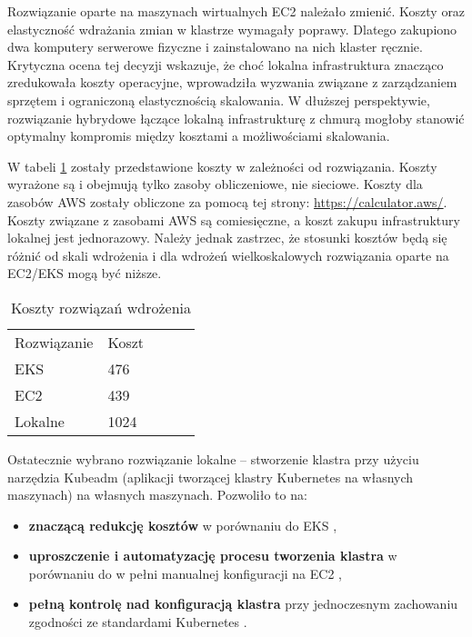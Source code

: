 \newpage

Rozwiązanie oparte na maszynach wirtualnych EC2 należało zmienić. Koszty oraz elastyczność wdrażania zmian w klastrze wymagały poprawy. Dlatego zakupiono dwa komputery serwerowe fizyczne i zainstalowano na nich klaster ręcznie. Krytyczna ocena tej decyzji wskazuje, że choć lokalna infrastruktura znacząco zredukowała koszty operacyjne, wprowadziła wyzwania związane z zarządzaniem sprzętem i ograniczoną elastycznością skalowania. W dłuższej perspektywie, rozwiązanie hybrydowe łączące lokalną infrastrukturę z chmurą mogłoby stanowić optymalny kompromis między kosztami a możliwościami skalowania.

W tabeli \ref{tab:koszty_rozwiazan_wdrazenia} zostały przedstawione koszty w zależności od rozwiązania. Koszty wyrażone są i obejmują tylko zasoby obliczeniowe, nie sieciowe. Koszty dla zasobów AWS zostały obliczone za pomocą tej strony: \url{https://calculator.aws/}. Koszty związane z zasobami AWS są comiesięczne, a koszt zakupu infrastruktury lokalnej jest jednorazowy. Należy jednak zastrzec, że stosunki kosztów będą się różnić od skali wdrożenia i dla wdrożeń wielkoskalowych rozwiązania oparte na EC2/EKS mogą być niższe.

\begin{table}[h]
    \centering
    \begin{tabular}{|l|l|lll}
    \cline{1-2}
    Rozwiązanie & Koszt &  &  &  \\ \cline{1-2}
    EKS         & 476   &  &  &  \\ \cline{1-2}
    EC2         & 439   &  &  &  \\ \cline{1-2}
    Lokalne     & 1024  &  &  &  \\ \cline{1-2}
    \end{tabular}
    \caption{Koszty rozwiązań wdrożenia}
    \label{tab:koszty_rozwiazan_wdrazenia}
\end{table}

\vspace{0.3em}

Ostatecznie wybrano rozwiązanie lokalne – stworzenie klastra przy użyciu narzędzia Kubeadm (aplikacji tworzącej klastry Kubernetes na własnych maszynach) \cite{kubeadm_docs} na własnych maszynach. Pozwoliło to na:
\begin{itemize}
    \item \textbf{znaczącą redukcję kosztów} w porównaniu do EKS \cite{eks_docs},
    \item \textbf{uproszczenie i automatyzację procesu tworzenia klastra} w porównaniu do w pełni manualnej konfiguracji na EC2 \cite{ec2_docs},
    \item \textbf{pełną kontrolę nad konfiguracją klastra} przy jednoczesnym zachowaniu zgodności ze standardami Kubernetes \cite{kubernetes}.
\end{itemize}

